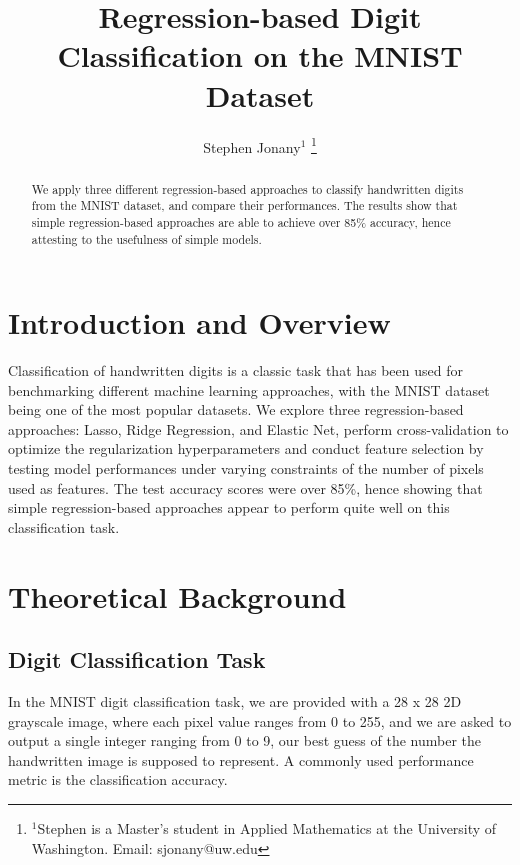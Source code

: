 \documentclass[letterpaper, 10 pt, conference]{ieeeconf}  %
\title{\LARGE \bf
Regression-based Digit Classification on the MNIST Dataset
}
\author{Stephen Jonany$^{1}$ %
\thanks{$^{1}$Stephen is a Master's student in Applied Mathematics at the 
University of Washington.
Email: sjonany@uw.edu}%
}
\begin{document}
\maketitle
\thispagestyle{empty}
\pagestyle{empty}


\begin{abstract}
We apply three different regression-based approaches to classify handwritten digits from the MNIST dataset, and compare their performances. The results show that simple regression-based approaches are able to achieve over 85\% accuracy, hence attesting to the usefulness of simple models.

\end{abstract}

\section{Introduction and Overview}
Classification of handwritten digits is a classic task that has been used for benchmarking different machine learning approaches, with the MNIST dataset\cite{lecun1998mnist} being one of the most popular datasets. We explore three regression-based approaches: Lasso\cite{tibshirani1994lasso}, Ridge Regression\cite{hoerl1970ridge}, and Elastic Net\cite{zou2005elasticnet}, perform cross-validation to optimize the regularization hyperparameters and conduct feature selection by testing model performances under varying constraints of the number of pixels used as features. The test accuracy scores were over 85\%, hence showing that simple regression-based approaches appear to perform quite well on this classification task.

\section{Theoretical Background}
\subsection{Digit Classification Task}
In the MNIST digit classification task, we are provided with a 28 x 28 2D grayscale image, where each pixel value ranges from 0 to 255, and we are asked to output a single integer ranging from 0 to 9, our best guess of the number the handwritten image is supposed to represent. A commonly used performance metric is the classification accuracy.
\end{document}
